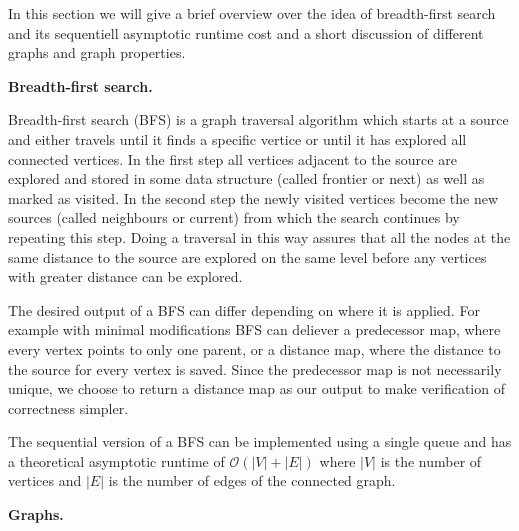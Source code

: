 \documentclass[letterpaper]{article}
\newcommand{\mypar}[1]{{\bf #1.}} %
\begin{document}
	
	In this section we will give a brief overview over the idea of breadth-first search and its sequentiell asymptotic runtime cost and a short discussion of different graphs and graph properties. 
	
	
	\mypar{Breadth-first search}
		
	Breadth-first search (BFS) is a graph traversal algorithm which starts at a source and either travels until it finds a specific vertice or until it has explored all connected vertices. In the first step all vertices adjacent to the source are explored and stored in some data structure (called frontier or next) as well as marked as visited. In the second step the newly visited vertices become the new sources (called neighbours or current) from which the search continues by repeating this step. Doing a traversal in this way assures that all the nodes at the same distance to the source are explored on the same level before any vertices with greater distance can be explored. 
	
	The desired output of a BFS can differ depending on where it is applied. For example with minimal modifications BFS can deliever a predecessor map, where every vertex points to only one parent, or a distance map, where the distance to the source for every vertex is saved. Since the predecessor map is not necessarily unique, we choose to return a distance map as our output to make verification of correctness simpler.  
	
	The sequential version of a BFS can be implemented using a single queue and has a theoretical asymptotic runtime of $\mathcal{O}(\left|V\right|+\left|E\right|)$ where $\left|V\right|$ is the number of vertices and $\left|E\right|$ is the number of edges of the connected graph.
	
	
	\mypar{Graphs}
	
	
	
	
\end{document}
